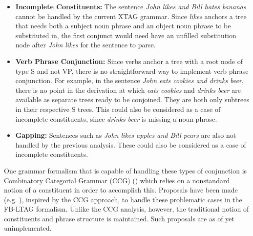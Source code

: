 \begin{itemize}
\item {\bf Incomplete Constituents:} The sentence 
{\it John likes and Bill hates bananas} cannot be handled by the
current XTAG grammar.  Since {\it likes} anchors a tree that needs
both a subject noun phrase and an object noun phrase to be substituted
in, the first conjunct would need have an unfilled substitution node
after {\it John likes} for the sentence to parse.

\item {\bf Verb Phrase Conjunction:} Since verbs anchor a tree with a root 
node of type S and not VP, there is no straightforward way to implement verb
phrase conjunction.  For example, in the sentence {\it John eats cookies and
drinks beer}, there is no point in the derivation at which {\it eats cookies}
and {\it drinks beer} are available as separate trees ready to be conjoined.
They are both only subtrees in their respective S trees.  This could also be
considered as a case of incomplete constituents, since {\it drinks beer} is
missing a noun phrase.

\item {\bf Gapping:}
Sentences such as {\it John likes apples and Bill pears} are also not
handled by the previous analysis.  These could also be considered as a case
of incomplete constituents.
\end{itemize}

One grammar formalism that is capable of handling these types of 
conjunction is Combinatory Categorial Grammar (CCG) (\cite{steedman90})
which relies on a nonstandard notion of a constituent in order to accomplish
this.  Proposals have been made (e.g. \cite{joshischabes91}),
inspired by the CCG approach, to handle these problematic cases in the
FB-LTAG formalism.  Unlike the CCG analysis, however, the traditional notion
of constituents and phrase structure is maintained.  Such proposals are
as of yet unimplemented.




